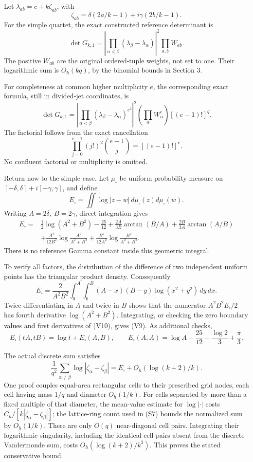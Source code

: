 \documentclass[11pt]{article}
\begin{document}
Let \(\lambda_{ab}=c+k\zeta_{ab}\), with \[
 \zeta_{ab}=\delta(2a/k-1)+i\gamma(2b/k-1).
\] For the simple quartet, the exact constructed reference determinant is \[
 \det G_{k,1}
 =\left|\prod_{\alpha<\beta}
   (\lambda_\beta-\lambda_\alpha)\right|^2
   \prod_{a,b}W_{ab}. \tag{V7}
\] The positive \(W_{ab}\) are the original ordered-tuple weights, not set to one. Their logarithmic sum is \(O_h(kq)\), by the binomial bounds in Section 3.

For completeness at common higher multiplicity \(e\), the corresponding exact formula, still in divided-jet coordinates, is \[
 \boxed{
 \det G_{k,1}
 =\left|\prod_{\alpha<\beta}
   (\lambda_\beta-\lambda_\alpha)^{e^2}\right|^2
   \left(\prod_{\alpha}W_\alpha^e\right)
   [(e-1)!]^q.
 } \tag{V8}
\] The factorial follows from the exact cancellation \[
 \prod_{j=0}^{e-1}(j!)^2\binom{e-1}{j}=[(e-1)!]^e.
\] No confluent factorial or multiplicity is omitted.

Return now to the simple case. Let \(\mu_\square\) be uniform probability measure on \([-\delta,\delta]+i[-\gamma,\gamma]\), and define \[
 E_\square=\iint\log|z-w|\,d\mu_\square(z)d\mu_\square(w).
\] Writing \(A=2\delta,\ B=2\gamma\), direct integration gives \[
 \boxed{\begin{aligned}
 E_\square={}&
 \frac12\log(A^2+B^2)-\frac{25}{12}
 +\frac{2A}{3B}\arctan(B/A)+\frac{2B}{3A}\arctan(A/B)\\
 &+\frac{A^2}{12B^2}\log\frac{A^2}{A^2+B^2}
 +\frac{B^2}{12A^2}\log\frac{B^2}{A^2+B^2}.
 \end{aligned}} \tag{V9}
\] There is no reference Gamma constant inside this geometric integral.

To verify all factors, the distribution of the difference of two independent uniform points has the triangular product density. Consequently \[
 E_\square=\frac{2}{A^2B^2}
 \int_0^A\int_0^B(A-x)(B-y)\log(x^2+y^2)\,dy\,dx. \tag{V10}
\] Twice differentiating in \(A\) and twice in \(B\) shows that the numerator \(A^2B^2E_\square/2\) has fourth derivative \(\log(A^2+B^2)\). Integrating, or checking the zero boundary values and first derivatives of (V10), gives (V9). As additional checks, \[
 E_\square(tA,tB)=\log t+E_\square(A,B),\qquad
 E_\square(A,A)=\log A-\frac{25}{12}+\frac{\log2}{3}+\frac{\pi}{3}.
\]

The actual discrete sum satisfies \[
 \frac1{q^2}\sum_{\alpha\ne\beta}
 \log|\zeta_\alpha-\zeta_\beta|
 =E_\square+O_h(\log(k+2)/k). \tag{V11}
\] One proof couples equal-area rectangular cells to their prescribed grid nodes, each cell having mass \(1/q\) and diameter \(O_h(1/k)\). For cells separated by more than a fixed multiple of that diameter, the mean-value estimate for \(\log|\cdot|\) costs \(C_h/[k|\zeta_\alpha-\zeta_\beta|]\); the lattice-ring count used in (S7) bounds the normalized sum by \(O_h(1/k)\). There are only \(O(q)\) near-diagonal cell pairs. Integrating their logarithmic singularity, including the identical-cell pairs absent from the discrete Vandermonde sum, costs \(O_h(\log(k+2)/k^2)\). This proves the stated conservative bound.
\end{document}
